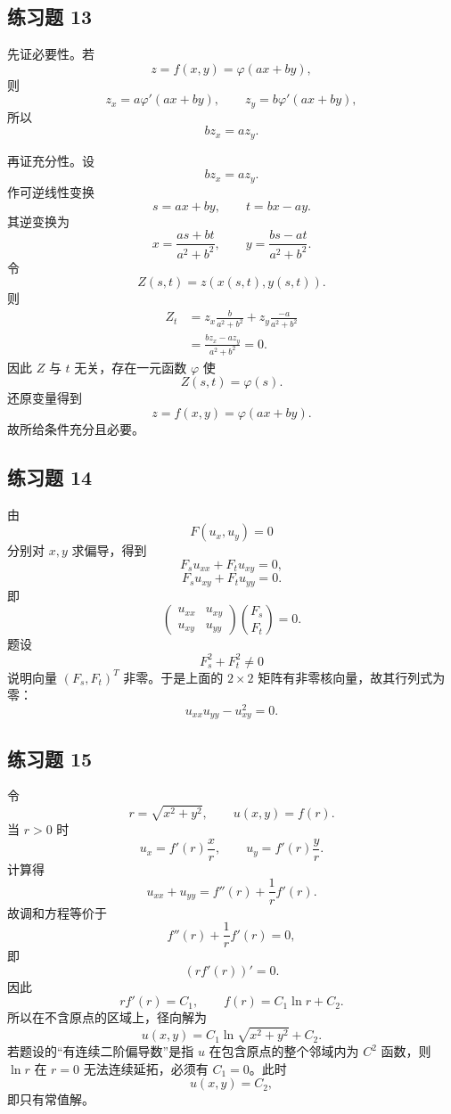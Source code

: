 \subsection*{练习题 13}
\begin{xsolution}
先证必要性。若
\[
  z=f(x,y)=\varphi(ax+by),
\]
则
\[
  z_x=a\varphi'(ax+by),
  \qquad
  z_y=b\varphi'(ax+by),
\]
所以
\[
  bz_x=az_y.
\]

再证充分性。设
\[
  bz_x=az_y.
\]
作可逆线性变换
\[
  s=ax+by,
  \qquad
  t=bx-ay.
\]
其逆变换为
\[
  x=\frac{as+bt}{a^2+b^2},
  \qquad
  y=\frac{bs-at}{a^2+b^2}.
\]
令
\[
  Z(s,t)=z(x(s,t),y(s,t)).
\]
则
\begin{align*}
  Z_t
  &=z_x\frac{b}{a^2+b^2}
    +z_y\frac{-a}{a^2+b^2}\\
  &=\frac{bz_x-az_y}{a^2+b^2}=0.
\end{align*}
因此 $Z$ 与 $t$ 无关，存在一元函数 $\varphi$ 使
\[
  Z(s,t)=\varphi(s).
\]
还原变量得到
\[
  \boxed{z=f(x,y)=\varphi(ax+by)}.
\]
故所给条件充分且必要。
\end{xsolution}

\subsection*{练习题 14}
\begin{xsolution}
由
\[
  F(u_x,u_y)=0
\]
分别对 $x,y$ 求偏导，得到
\[
  F_su_{xx}+F_tu_{xy}=0,
\]
\[
  F_su_{xy}+F_tu_{yy}=0.
\]
即
\[
  \begin{pmatrix}
    u_{xx}&u_{xy}\\
    u_{xy}&u_{yy}
  \end{pmatrix}
  \binom{F_s}{F_t}=0.
\]
题设
\[
  F_s^2+F_t^2\ne0
\]
说明向量 $(F_s,F_t)^T$ 非零。于是上面的 $2\times2$ 矩阵有非零核向量，故其行列式为零：
\[
  \boxed{u_{xx}u_{yy}-u_{xy}^2=0}.
\]
\end{xsolution}

\subsection*{练习题 15}
\begin{xsolution}
令
\[
  r=\sqrt{x^2+y^2},
  \qquad u(x,y)=f(r).
\]
当 $r>0$ 时
\[
  u_x=f'(r)\frac xr,
  \qquad
  u_y=f'(r)\frac yr.
\]
计算得
\[
  u_{xx}+u_{yy}=f''(r)+\frac1r f'(r).
\]
故调和方程等价于
\[
  f''(r)+\frac1r f'(r)=0,
\]
即
\[
  (r f'(r))'=0.
\]
因此
\[
  r f'(r)=C_1,
  \qquad
  f(r)=C_1\ln r+C_2.
\]
所以在不含原点的区域上，径向解为
\[
  \boxed{u(x,y)=C_1\ln\sqrt{x^2+y^2}+C_2}.
\]
若题设的“有连续二阶偏导数”是指 $u$ 在包含原点的整个邻域内为 $C^2$ 函数，则 $\ln r$ 在 $r=0$ 无法连续延拓，必须有 $C_1=0$。此时
\[
  \boxed{u(x,y)=C_2},
\]
即只有常值解。
\end{xsolution}

